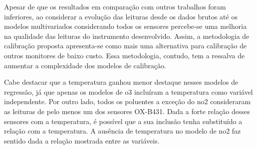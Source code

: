 Apesar de que os resultados em comparação com outros trabalhos foram inferiores, ao considerar a evolução das leituras desde os dados brutos até os modelos multivariados considerando todos os sensores percebe-se uma melhoria na qualidade das leituras do instrumento desenvolvido. Assim, a metodologia de calibração proposta apresenta-se como mais uma alternativa para calibração de outros monitores de baixo custo. Essa metodologia, contudo, tem a ressalva de aumentar a complexidade dos modelos de calibração.

Cabe destacar que a temperatura ganhou menor destaque nesses modelos de regressão, já que apenas os modelos de \acrshort{o3} incluíram a temperatura como variável independente. Por outro lado, todos os poluentes a exceção do \acrshort{no2} consideraram as leituras de pelo menos um dos sensores OX-B431. Dada a forte relação desses sensores com a temperatura, é possível que a sua inclusão tenha substituído a relação com a temperatura. A ausência de temperatura no modelo de \acrshort{no2} faz sentido dada a relação mostrada entre as variáveis.
